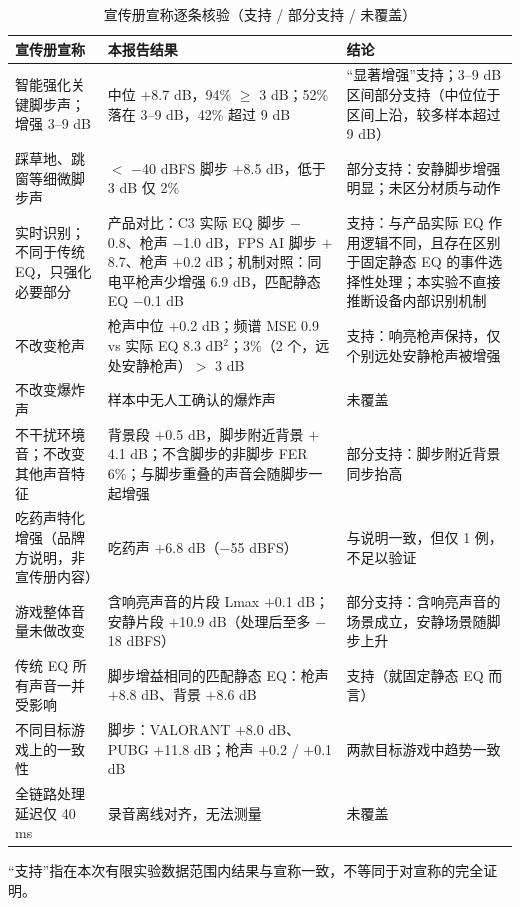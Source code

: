 \begin{table}[htbp]\centering
\caption{宣传册宣称逐条核验（支持 / 部分支持 / 未覆盖）}\label{tab:claims}
{\footnotesize\begin{threeparttable}
\begin{tabularx}{\linewidth}{LLL}\toprule
宣传册宣称 & 本报告结果 & 结论 \\
\midrule
智能强化关键脚步声；增强 3--9 dB & 中位 $+$8.7 dB，94\% $\geq$ 3 dB；52\% 落在 3--9 dB，42\% 超过 9 dB & “显著增强”支持；3--9 dB 区间部分支持（中位位于区间上沿，较多样本超过 9 dB） \\
踩草地、跳窗等细微脚步声 & $<$ $-$40 dBFS 脚步 $+$8.5 dB，低于 3 dB 仅 2\% & 部分支持：安静脚步增强明显；未区分材质与动作 \\
实时识别；不同于传统 EQ，只强化必要部分 & 产品对比：C3 实际 EQ 脚步 $-$0.8、枪声 $-$1.0 dB，FPS AI 脚步 $+$8.7、枪声 $+$0.2 dB；机制对照：同电平枪声少增强 6.9 dB，匹配静态 EQ $-$0.1 dB & 支持：与产品实际 EQ 作用逻辑不同，且存在区别于固定静态 EQ 的事件选择性处理；本实验不直接推断设备内部识别机制 \\
不改变枪声 & 枪声中位 $+$0.2 dB；频谱 MSE 0.9 vs 实际 EQ 8.3 dB$^{2}$；3\%（2 个，远处安静枪声）$>$ 3 dB & 支持：响亮枪声保持，仅个别远处安静枪声被增强 \\
不改变爆炸声 & 样本中无人工确认的爆炸声 & 未覆盖 \\
不干扰环境音；不改变其他声音特征 & 背景段 $+$0.5 dB，脚步附近背景 $+$4.1 dB；不含脚步的非脚步 FER 6\%；与脚步重叠的声音会随脚步一起增强 & 部分支持：脚步附近背景同步抬高 \\
吃药声特化增强（品牌方说明，非宣传册内容） & 吃药声 $+$6.8 dB（$-$55 dBFS） & 与说明一致，但仅 1 例，不足以验证 \\
游戏整体音量未做改变 & 含响亮声音的片段 Lmax $+$0.1 dB；安静片段 $+$10.9 dB（处理后至多 $-$18 dBFS） & 部分支持：含响亮声音的场景成立，安静场景随脚步上升 \\
传统 EQ 所有声音一并受影响 & 脚步增益相同的匹配静态 EQ：枪声 $+$8.8 dB、背景 $+$8.6 dB & 支持（就固定静态 EQ 而言） \\
不同目标游戏上的一致性 & 脚步：VALORANT $+$8.0 dB、PUBG $+$11.8 dB；枪声 $+$0.2 / $+$0.1 dB & 两款目标游戏中趋势一致 \\
全链路处理延迟仅 40 ms & 录音离线对齐，无法测量 & 未覆盖 \\
\bottomrule\end{tabularx}
\begin{tablenotes}\footnotesize\item “支持”指在本次有限实验数据范围内结果与宣称一致，不等同于对宣称的完全证明。\end{tablenotes}\end{threeparttable}}
\end{table}
